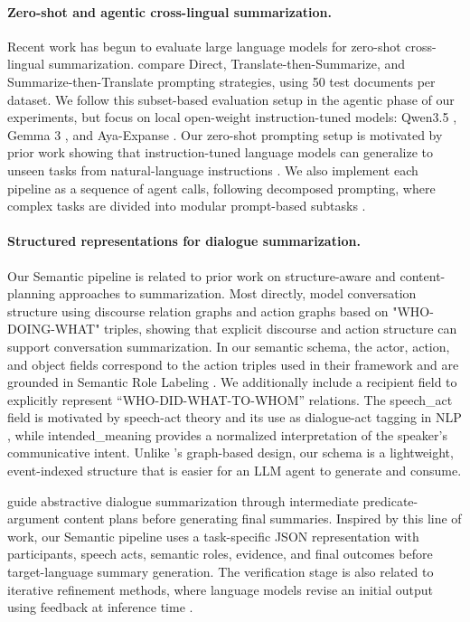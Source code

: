 \documentclass[11pt]{article}
\begin{document}
\paragraph{Zero-shot and agentic cross-lingual summarization.}
Recent work has begun to evaluate large language models for zero-shot cross-lingual summarization. \citet{wang-etal-2023-zero-shot-cls} compare Direct, Translate-then-Summarize, and Summarize-then-Translate prompting strategies, using 50 test documents per dataset. We follow this subset-based evaluation setup in the agentic phase of our experiments, but focus on local open-weight instruction-tuned models: Qwen3.5 \citep{qwen-team-2026-qwen35omni}, Gemma 3 \citep{gemma-team-2025-gemma3}, and Aya-Expanse \citep{dang-etal-2024-aya-expanse}. Our zero-shot prompting setup is motivated by prior work showing that instruction-tuned language models can generalize to unseen tasks from natural-language instructions \citep{wei-etal-2022-finetuned,chung-etal-2024-scaling}. We also implement each pipeline as a sequence of agent calls, following decomposed prompting, where complex tasks are divided into modular prompt-based subtasks \citep{khot-etal-2023-decomposed}.

\paragraph{Structured representations for dialogue summarization.}
Our Semantic pipeline is related to prior work on structure-aware and content-planning approaches to summarization. Most directly, \citet{chen-yang-2021-structure} model conversation structure using discourse relation graphs and action graphs based on "WHO-DOING-WHAT" triples, showing that explicit discourse and action structure can support conversation summarization. In our semantic schema, the actor, action, and object fields correspond to the action triples used in their framework and are grounded in Semantic Role Labeling \citep{gildea-jurafsky-2002-automatic}. We additionally include a recipient field to explicitly represent “WHO-DID-WHAT-TO-WHOM” relations. The speech\_act field is motivated by speech-act theory \citep{Austin1962} and its use as dialogue-act tagging in NLP \citep{stolcke-etal-2000-dialogue}, while intended\_meaning provides a normalized interpretation of the speaker’s communicative intent. Unlike \citet{chen-yang-2021-structure}’s graph-based design, our schema is a lightweight, event-indexed structure that is easier for an LLM agent to generate and consume.

\citet{wang-etal-2022-guiding} guide abstractive dialogue summarization through intermediate predicate-argument content plans before generating final summaries. Inspired by this line of work, our Semantic pipeline uses a task-specific JSON representation with participants, speech acts, semantic roles, evidence, and final outcomes before target-language summary generation. The verification stage is also related to iterative refinement methods, where language models revise an initial output using feedback at inference time \citep{madaan-etal-2023-self-refine}.
\end{document}
